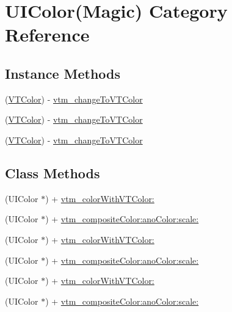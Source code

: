 \hypertarget{category_u_i_color_07_magic_08}{}\section{U\+I\+Color(Magic) Category Reference}
\label{category_u_i_color_07_magic_08}
\subsection*{Instance Methods}
\begin{DoxyCompactItemize}
\item 
(\mbox{\hyperlink{struct_v_t_color}{V\+T\+Color}}) -\/ \mbox{\hyperlink{category_u_i_color_07_magic_08_a874f8f68a0afe18d2f666036a1dc3337}{vtm\+\_\+change\+To\+V\+T\+Color}}
\item 
(\mbox{\hyperlink{struct_v_t_color}{V\+T\+Color}}) -\/ \mbox{\hyperlink{category_u_i_color_07_magic_08_a874f8f68a0afe18d2f666036a1dc3337}{vtm\+\_\+change\+To\+V\+T\+Color}}
\item 
(\mbox{\hyperlink{struct_v_t_color}{V\+T\+Color}}) -\/ \mbox{\hyperlink{category_u_i_color_07_magic_08_a874f8f68a0afe18d2f666036a1dc3337}{vtm\+\_\+change\+To\+V\+T\+Color}}
\end{DoxyCompactItemize}
\subsection*{Class Methods}
\begin{DoxyCompactItemize}
\item 
(U\+I\+Color $\ast$) + \mbox{\hyperlink{category_u_i_color_07_magic_08_aafad3d97a89e9f3d60a4237c7e3e5b3b}{vtm\+\_\+color\+With\+V\+T\+Color\+:}}
\item 
(U\+I\+Color $\ast$) + \mbox{\hyperlink{category_u_i_color_07_magic_08_a40f82f2b90825163129c4954ed33466c}{vtm\+\_\+composite\+Color\+:ano\+Color\+:scale\+:}}
\item 
(U\+I\+Color $\ast$) + \mbox{\hyperlink{category_u_i_color_07_magic_08_aafad3d97a89e9f3d60a4237c7e3e5b3b}{vtm\+\_\+color\+With\+V\+T\+Color\+:}}
\item 
(U\+I\+Color $\ast$) + \mbox{\hyperlink{category_u_i_color_07_magic_08_a40f82f2b90825163129c4954ed33466c}{vtm\+\_\+composite\+Color\+:ano\+Color\+:scale\+:}}
\item 
(U\+I\+Color $\ast$) + \mbox{\hyperlink{category_u_i_color_07_magic_08_aafad3d97a89e9f3d60a4237c7e3e5b3b}{vtm\+\_\+color\+With\+V\+T\+Color\+:}}
\item 
(U\+I\+Color $\ast$) + \mbox{\hyperlink{category_u_i_color_07_magic_08_a40f82f2b90825163129c4954ed33466c}{vtm\+\_\+composite\+Color\+:ano\+Color\+:scale\+:}}
\end{DoxyCompactItemize}


